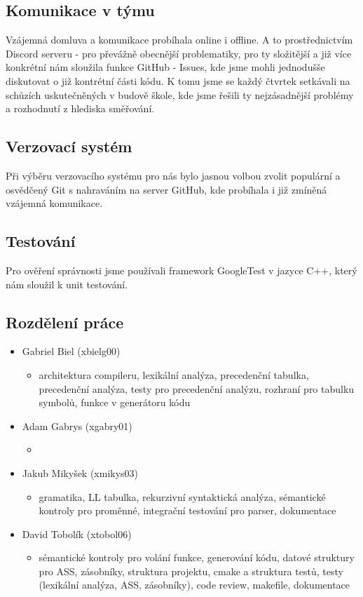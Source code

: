 \documentclass[a4paper, 12pt]{article}
\begin{document}
    \subsection{Komunikace v týmu}
        Vzájemná domluva a komunikace probíhala online i offline. A to prostřednictvím Discord serveru - pro převážně obecnější problematiky, pro ty složitější a již více konkrétní nám sloužila funkce GitHub - Issues, kde jsme mohli jednodušše diskutovat o již kontrétní části kódu. K tomu jsme se každý čtvrtek setkávali na schůzích uskutečněných v budově škole, kde jsme řešili ty nejzásadnější problémy a rozhodnutí z hlediska směřování.
    \subsection{Verzovací systém}
        Při výběru verzovacího systému pro nás bylo jasnou volbou zvolit populární a osvědčený Git s nahraváním na server GitHub, kde probíhala i již zmíněná vzájemná komunikace.
    \subsection{Testování}
        Pro ověření správnosti jsme používali framework GoogleTest v jazyce C++, který nám sloužil k unit testování.
    \subsection{Rozdělení práce}
        \begin{itemize}
            \item Gabriel Biel (xbielg00)
                \begin{itemize}
                    \item architektura compileru, lexikální analýza, precedenční tabulka, precedenční analýza, testy pro precedenční analýzu, rozhraní pro tabulku symbolů, funkce v generátoru kódu
                \end{itemize}
            \item Adam Gabrys (xgabry01)
                \begin{itemize}
                    \item
                \end{itemize}
            \item Jakub Mikyšek (xmikys03)
                \begin{itemize}
                    \item gramatika, LL tabulka, rekurzivní syntaktická analýza, sémantické kontroly pro proměnné, integrační testování pro parser, dokumentace 
                \end{itemize}
            \item David Tobolík (xtobol06)
                \begin{itemize}
                    \item sémantické kontroly pro volání funkce, generování kódu, datové struktury pro ASS, zásobníky, struktura projektu, cmake a struktura testů, testy (lexikální analýza, ASS, zásobníky), code review, makefile, dokumentace
                \end{itemize}
        \end{itemize}

    \newpage
	\renewcommand{\refname}{Zdroje}
	\printbibliography
\end{document}
